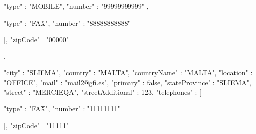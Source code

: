 {{{{                                                                                                              "type" : "MOBILE",
                                                                                                              "number" : "99999999999"
                                                                                              }, {

                                                                                                              "type" : "FAX",
                                                                                                              "number" : "88888888888"

                                                                                              }
                                                                               ],
                                                                              "zipCode" : "00000"
                                                               }, {

                                                                              "city" : "SLIEMA",
                                                                              "country" : "MALTA",
                                                                              "countryName" : "MALTA",
                                                                              "location" : "OFFICE",
                                                                              "mail" : "mail2@gfi.es",
                                                                              "primary" : false,
                                                                              "stateProvince" : "SLIEMA",
                                                                              "street" : "MERCIEQA",
                                                                              "streetAdditional" : 123,
                                                                              "telephones" : [{
                                                                                                              "type" : "FAX",
                                                                                                              "number" : "11111111"

                                                                                              }
                                                                              ],
                                                                              "zipCode" : "11111"

}}}
